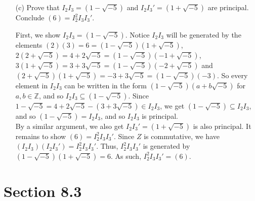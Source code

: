 \documentclass[10pt]{article}
\newcommand{\Z}{\mathbb{Z}}
\begin{document}
\begin{itemize}
\begin{itemize}
\begin{proof}
Since $1+\sqrt{-5} \in I_2$, and $1 - \sqrt{-5} = 2 - (1 + \sqrt{-5}) \in I_2$, then $6 = (1 + \sqrt{-5})(1 - \sqrt{-5}) \in I_2^2$. So we have $6,4 \in I_2^2$, and so $2 = 6 - 4 \in I_2^2$. Thus $(2) \subseteq I_2^2$, and so $(2) = I_2^2$. 
\end{proof}


\item[(c)] Prove that $I_2I_3 = (1 - \sqrt{-5})$ and $I_2I_3' = (1+\sqrt{-5})$ are principal. Conclude $(6) = I_2^2I_3I_3'$. 

First, we show $I_2I_3 = (1 - \sqrt{-5})$. Notice $I_2I_3$ will be generated 
by the elements $(2)(3) = 6 = (1-\sqrt{-5})(1+\sqrt{-5})$, $2(2 + \sqrt{-5}) = 
4+2\sqrt{-5} = (1-\sqrt{-5})(-1+\sqrt{-5})$, $3(1+\sqrt{-5}) = 3+3\sqrt{-5} = 
(1-\sqrt{-5})(-2+\sqrt{-5})$ and $(2+\sqrt{-5})(1+\sqrt{-5}) = -3 + 3\sqrt{-5} 
= (1-\sqrt{-5})(-3)$. So every element in $I_2I_3$ can be written in the form 
$(1 - \sqrt{-5})(a+b\sqrt{-5})$ for $a,b \in \Z$, and so $I_2I_3 \subseteq 
(1-\sqrt{-5})$. Since $1-\sqrt{-5} = 4+2\sqrt{-5} - (3+3\sqrt{-5})  \in 
I_2I_3$, we get $(1-\sqrt{-5}) \subseteq I_2I_3$, and so $(1-\sqrt{-5}) = 
I_2I_3$, and so $I_2I_3$ is principal.
\\


By a similar argument, we also get $I_2I_3' = (1+\sqrt{-5})$ is also principal. It remains to show $(6) = I_2^2I_3I_3'$. Since $Z$ is commutative, we have $(I_2I_3)(I_2I_3') = I_2^2I_3I_3'$. Thus, $I_2^2I_3I_3'$ is generated by $(1-\sqrt{-5})(1+\sqrt{-5}) = 6$. As such, $I_2^2I_3I_3' = (6)$. 

\end{itemize}

\end{itemize}

\section*{Section 8.3}
\end{document}
